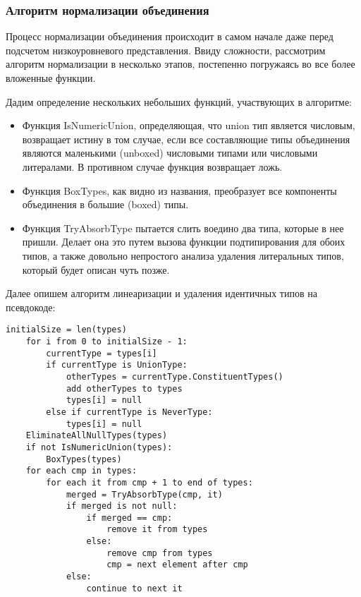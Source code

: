 \subsubsection{Алгоритм нормализации объединения}

Процесс нормализации объединения происходит в самом начале даже перед подсчетом низкоуровневого представления.
Ввиду сложности, рассмотрим алгоритм нормализации в несколько этапов, постепенно погружаясь во все более вложенные
функции.

Дадим определение нескольких небольших функций, участвующих в алгоритме:

\begin{itemize}[left=2em]
    \item Функция IsNumericUnion, определяющая, что union тип является числовым, возвращает истину в том случае, если все
составляющие типы объединения являются маленькими (unboxed) числовыми типами или числовыми литералами.
В противном случае функция возвращает ложь.
    \item Функция BoxTypes, как видно из названия, преобразует все компоненты объединения в большие (boxed) типы.
    \item Функция TryAbsorbType пытается слить воедино два типа, которые в нее пришли.
    Делает она это путем вызова функции подтипирования для обоих типов, а также довольно непростого анализа удаления
    литеральных типов, который будет описан чуть позже.
\end{itemize}

Далее опишем алгоритм линеаризации и удаления идентичных типов на псевдокоде:

\begin{lstlisting}[label={lst:normalization}]
    initialSize = len(types)
    for i from 0 to initialSize - 1:
        currentType = types[i]
        if currentType is UnionType:
            otherTypes = currentType.ConstituentTypes()
            add otherTypes to types
            types[i] = null
        else if currentType is NeverType:
            types[i] = null
    EliminateAllNullTypes(types)
    if not IsNumericUnion(types):
        BoxTypes(types)
    for each cmp in types:
        for each it from cmp + 1 to end of types:
            merged = TryAbsorbType(cmp, it)
            if merged is not null:
                if merged == cmp:
                    remove it from types
                else:
                    remove cmp from types
                    cmp = next element after cmp
            else:
                continue to next it
\end{lstlisting}

